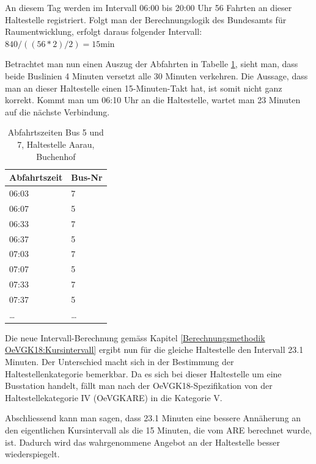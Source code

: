 An diesem Tag werden im Intervall 06:00 bis 20:00 Uhr 56 Fahrten an dieser \gls{Haltestelle} registriert.
Folgt man der Berechnungslogik des Bundesamts für Raumentwicklung, erfolgt daraus folgender Intervall:
$ 840 / ((56 * 2) / 2) = 15 \text{min}$

Betrachtet man nun einen Auszug der Abfahrten in Tabelle \ref{table:Abfahrtszeiten Aarau, Buchenhof}, sieht man, dass beide Buslinien 4 Minuten versetzt alle 30 Minuten verkehren.
Die Aussage, dass man an dieser \gls{Haltestelle} einen 15-Minuten-Takt hat, ist somit nicht ganz korrekt.
Kommt man um 06:10 Uhr an die \gls{Haltestelle}, wartet man 23 Minuten auf die nächste Verbindung.

\begin{table}[H]
    \centering
    \begin{tabular}[c]{l l}
        \toprule
        \textbf{Abfahrtszeit}   & \textbf{Bus-Nr}\\
        \midrule
        06:03                   & 7\\
        06:07                   & 5\\
        06:33                   & 7\\
        06:37                   & 5\\
        07:03                   & 7\\
        07:07                   & 5\\
        07:33                   & 7\\
        07:37                   & 5\\
        \dots                   & \dots\\
        \bottomrule
    \end{tabular}
    \caption{Abfahrtszeiten Bus 5 und 7, Haltestelle Aarau, Buchenhof}
    \label{table:Abfahrtszeiten Aarau, Buchenhof}
\end{table}

Die neue Intervall-Berechnung gemäss Kapitel \ref{Berechnungsmethodik OeVGK18:Kursintervall} ergibt nun für die gleiche \gls{Haltestelle} den Intervall 23.1 Minuten.
Der Unterschied macht sich in der Bestimmung der Haltestellenkategorie bemerkbar.
Da es sich bei dieser \gls{Haltestelle} um eine Busstation handelt, fällt man nach der \gls{OeVGK18}-Spezifikation von der Haltestellekategorie IV (\gls{OeVGKARE}) in die Kategorie V.

Abschliessend kann man sagen, dass 23.1 Minuten eine bessere Annäherung an den eigentlichen Kursintervall als die 15 Minuten, die vom \acs{ARE} berechnet wurde, ist.
Dadurch wird das wahrgenommene Angebot an der \gls{Haltestelle} besser wiederspiegelt.


